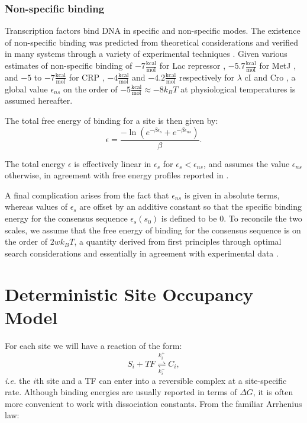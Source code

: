 \documentclass{article}
\begin{document}
\subsubsection{Non-specific binding}
Transcription factors bind DNA in specific and non-specific modes.
The existence of non-specific binding was predicted from theoretical
considerations \cite{kaohuang77} and verified in many systems through
a variety of experimental techniques \cite{revzin90}.  Given various
estimates of non-specific binding of
$-7\frac{\mathrm{kcal}}{\textrm{mol}}$ for Lac repressor
\cite{wang77}, $-5.7\frac{\mathrm{kcal}}{\textrm{mol}}$ for MetJ
\cite{augustus10}, and $-5$ to $-7 \frac{\mathrm{kcal}}{\textrm{mol}}$
for CRP \cite{takahashi79}, $-4\frac{\mathrm{kcal}}{\textrm{mol}}$ and
$-4.2 \frac{\mathrm{kcal}}{\textrm{mol}}$ respectively for $\lambda$
cI and Cro \cite{bakk2004}, a global value $\epsilon_{ns}$ on the
order of $-5\frac{\mathrm{kcal}}{\textrm{mol}}\approx -8 k_BT$ at
physiological temperatures is assumed hereafter.

The total free energy of binding for a site is then given by:
\begin{equation}
  \epsilon = \frac{-\ln(e^{-\beta \epsilon_s} + e^{-\beta \epsilon_{ns}})}{\beta}.\label{eq:totalbindingenergy}
\end{equation}

  The total energy $\epsilon$ is effectively linear in $\epsilon_s$ for $\epsilon_s < \epsilon_{ns}$, and assumes the value $\epsilon_{ns}$ otherwise, in agreement with free energy profiles reported in \cite{maerkl2007}.

  A final complication arises from the fact that $\epsilon_{ns}$ is
  given in absolute terms, whereas values of $\epsilon_s$ are offset
  by an additive constant so that the specific binding energy for the
  consensus sequence $\epsilon_s(s_0)$ is defined to be 0.  To
  reconcile the two scales, we assume that the free energy of binding
  for the consensus sequence is on the order of $2wk_BT$, a quantity
  derived from first principles through optimal search considerations
  \cite{gerland02} and essentially in agreement with experimental data
  \cite{bakk2004}.
\section{Deterministic Site Occupancy Model}
For each site we will have a reaction of the form:
\begin{equation}
  \label{eq:s_reaction}
  S_i + TF \overset{k^+_i}{\underset{k^-_i}{\rightleftharpoons}} C_i,
\end{equation}
\textit{i.e.} the $i$th site and a TF can enter into a reversible
complex at a site-specific rate.  Although binding energies are
usually reported in terms of $\Delta G$, it is often more convenient
to work with dissociation constants.  From the familiar Arrhenius law:
\end{document}
